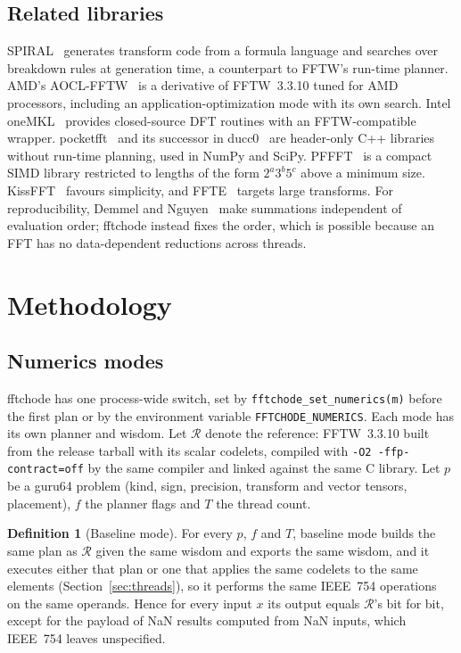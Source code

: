 \documentclass[10pt]{article}
\theoremstyle{definition}
\newtheorem{definition}{Definition}
\begin{document}
\subsection{Related libraries}
SPIRAL~\cite{puschel2005spiral} generates transform code from a formula language and searches over breakdown rules at generation time, a counterpart to FFTW's run-time planner. AMD's AOCL-FFTW~\cite{aoclfftw} is a derivative of FFTW~3.3.10 tuned for AMD processors, including an application-optimization mode with its own search. Intel oneMKL~\cite{onemkl} provides closed-source DFT routines with an FFTW-compatible wrapper. pocketfft~\cite{pocketfft} and its successor in ducc0~\cite{ducc0} are header-only C++ libraries without run-time planning, used in NumPy and SciPy. PFFFT~\cite{pffft} is a compact SIMD library restricted to lengths of the form $2^a3^b5^c$ above a minimum size. KissFFT~\cite{kissfft} favours simplicity, and FFTE~\cite{ffte} targets large transforms. For reproducibility, Demmel and Nguyen~\cite{demmel2013reproducible} make summations independent of evaluation order; fftchode instead fixes the order, which is possible because an FFT has no data-dependent reductions across threads.

\section{Methodology}\label{sec:method}

\subsection{Numerics modes}\label{sec:modes}

fftchode has one process-wide switch, set by \texttt{fftchode\_set\_numerics(m)} before the first plan or by the environment variable \texttt{FFTCHODE\_NUMERICS}. Each mode has its own planner and wisdom. Let $\mathcal{R}$ denote the reference: FFTW~3.3.10 built from the release tarball with its scalar codelets, compiled with \texttt{-O2 -ffp-contract=off} by the same compiler and linked against the same C library. Let $p$ be a guru64 problem (kind, sign, precision, transform and vector tensors, placement), $f$ the planner flags and $T$ the thread count.

\begin{definition}[Baseline mode]\label{def:baseline}
For every $p$, $f$ and $T$, baseline mode builds the same plan as $\mathcal{R}$ given the same wisdom and exports the same wisdom, and it executes either that plan or one that applies the same codelets to the same elements (Section~\ref{sec:threads}), so it performs the same IEEE~754 operations~\cite{ieee754} on the same operands. Hence for every input $x$ its output equals $\mathcal{R}$'s bit for bit, except for the payload of NaN results computed from NaN inputs, which IEEE~754 leaves unspecified.
\end{definition}
\end{document}
